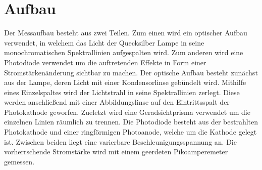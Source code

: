 \section{Aufbau}
\label{sec:Aufbau}
Der Messaufbau besteht aus zwei Teilen. Zum einen wird ein optischer Aufbau verwendet,
in welchem das Licht der Quecksilber Lampe in seine monochromatischen Spektrallinien
aufgespalten wird. Zum anderen wird eine Photodiode verwendet um die auftretenden
Effekte in Form einer Stromstärkenänderung sichtbar zu machen. Der optische Aufbau
besteht zunächst aus der Lampe, deren Licht mit einer Kondensorlinse gebündelt wird.
 Mithilfe eines Einzelspaltes wird der Lichtstrahl in seine Spektrallinien zerlegt.
 Diese werden anschließend mit einer Abbildungslinse auf den Eintrittsspalt der
 Photokathode geworfen. Zueletzt wird eine Geradsichtprisma verwendet um die
 einzelnen Linien räumlich zu trennen. Die Photodiode besteht aus der bestrahlten
 Photokathode und einer ringförmigen Photoanode, welche um die Kathode gelegt ist.
 Zwischen beiden liegt eine varierbare Beschleunigungsspannung an. Die vorherrschende
 Stromstärke wird mit einem geerdeten Pikoamperemeter gemessen.
